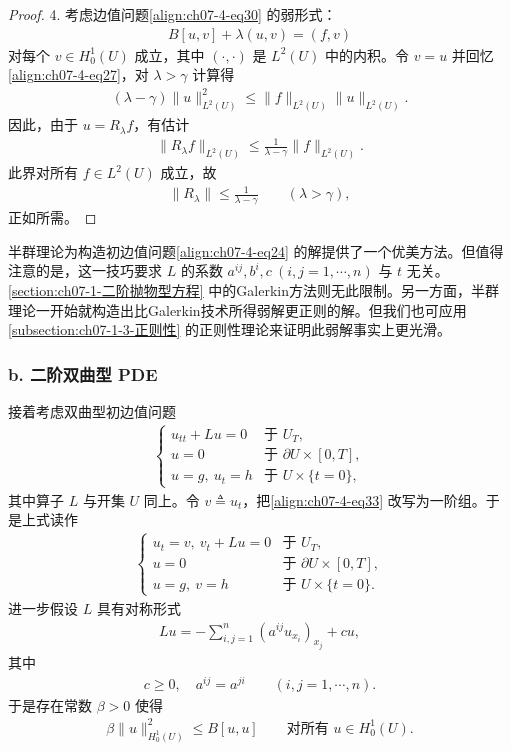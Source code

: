 \documentclass[../../main.tex]{subfiles}
\begin{document}
\begin{proof}
4. 考虑边值问题\eqref{align:ch07-4-eq30} 的弱形式：
\begin{align*}
B[u,v]+\lambda(u,v)=(f,v)
\end{align*}
对每个 $v\in H^1_0(U)$ 成立，其中 $(\cdot,\cdot)$ 是 $L^2(U)$ 中的内积。令 $v=u$ 并回忆\eqref{align:ch07-4-eq27}，对 $\lambda>\gamma$ 计算得
\begin{align*}
(\lambda-\gamma)\|u\|_{L^2(U)}^2\leqslant \|f\|_{L^2(U)}\|u\|_{L^2(U)}.
\end{align*}
因此，由于 $u=R_\lambda f$，有估计
\begin{align*}
\|R_\lambda f\|_{L^2(U)}\leqslant \frac{1}{\lambda-\gamma}\|f\|_{L^2(U)}.
\end{align*}
此界对所有 $f\in L^2(U)$ 成立，故
\begin{align}
\|R_\lambda\|\leqslant\frac{1}{\lambda-\gamma}\qquad (\lambda>\gamma),\label{align:ch07-4-eq32}
\end{align}
正如所需。
\end{proof}

半群理论为构造初边值问题\eqref{align:ch07-4-eq24} 的解提供了一个优美方法。但值得注意的是，这一技巧要求 $L$ 的系数 $a^{ij},b^i,c\ (i,j=1,\cdots,n)$ 与 $t$ 无关。\cref{section:ch07-1-二阶抛物型方程} 中的Galerkin方法则无此限制。另一方面，半群理论一开始就构造出比Galerkin技术所得弱解更正则的解。但我们也可应用\cref{subsection:ch07-1-3-正则性} 的正则性理论来证明此弱解事实上更光滑。

\subsubsection*{b. 二阶双曲型 PDE}

接着考虑双曲型初边值问题
\begin{align}
\begin{cases}
u_{tt}+Lu=0 & \text{于 } U_T,\\
u=0 & \text{于 } \partial U\times[0,T],\\
u=g,\ u_t=h & \text{于 } U\times\{t=0\},
\end{cases}\label{align:ch07-4-eq33}
\end{align}
其中算子 $L$ 与开集 $U$ 同上。令 $v\triangleq u_t$，把\eqref{align:ch07-4-eq33} 改写为一阶组。于是上式读作
\begin{align*}
\begin{cases}
u_t=v,\ v_t+Lu=0 & \text{于 } U_T,\\
u=0 & \text{于 } \partial U\times[0,T],\\
u=g,\ v=h & \text{于 } U\times\{t=0\}.
\end{cases}
\end{align*}
进一步假设 $L$ 具有对称形式
\begin{align*}
Lu=-\sum_{i,j=1}^n(a^{ij}u_{x_i})_{x_j}+cu,
\end{align*}
其中
\begin{align}
c\geqslant 0,\quad a^{ij}=a^{ji}\qquad (i,j=1,\cdots,n).\label{align:ch07-4-eq34}
\end{align}
于是存在常数 $\beta>0$ 使得
\begin{align}
\beta\|u\|_{H^1_0(U)}^2\leqslant B[u,u]\qquad \text{对所有 } u\in H^1_0(U).\label{align:ch07-4-eq35}
\end{align}
\end{document}
